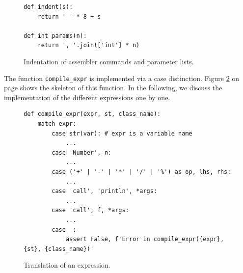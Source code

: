 \begin{figure}[!ht]
\centering
\begin{verbatim}
def indent(s):
    return ' ' * 8 + s

def int_params(n):
    return ', '.join(['int'] * n)
\end{verbatim}
\vspace*{-0.3cm}
\caption{Indentation of assembler commands and parameter lists.}
\label{fig:Compiler.ipynb:indent}
\end{figure}

\noindent
The function \texttt{compile\_expr} is implemented via a case distinction.  Figure
\ref{fig:Compiler.ipynb:compile_expr} on page \pageref{fig:Compiler.ipynb:compile_expr} shows the skeleton of
this function.  In the following, we discuss the implementation of the different expressions one by one.

\begin{figure}[!ht]
\centering
\begin{verbatim}
def compile_expr(expr, st, class_name):
    match expr:
        case str(var): # expr is a variable name
            ...
        case 'Number', n:
            ...
        case ('+' | '-' | '*' | '/' | '%') as op, lhs, rhs:
            ...
        case 'call', 'println', *args:
            ...
        case 'call', f, *args:
            ...
        case _:
            assert False, f'Error in compile_expr({expr}, {st}, {class_name})'
\end{verbatim}
\vspace*{-0.3cm}
\caption{Translation of an expression.}
\label{fig:Compiler.ipynb:compile_expr}
\end{figure}


